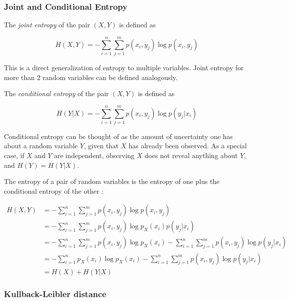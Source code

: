 \documentclass[12pt]{article}
\begin{document}
\subsubsection{Joint and Conditional Entropy}

The \textit{joint entropy} \cite{cover-thomas} of the pair $(X,Y)$ is defined as 

\begin{equation}
H(X,Y) = -\sum_{i=1}^n \sum_{j=1}^m p(x_i,y_j) \log p(x_i,y_j)
\label{eq:cond-etropy}
\end{equation}

This is a direct generalization of entropy to multiple variables. Joint entropy for more than 2 random variables can be defined analogously.

The \textit{conditional entropy} \cite{cover-thomas} of the pair $(X,Y)$ is defined as 

\begin{equation}
H(Y|X) = - \sum_{i=1}^n \sum_{j=1}^m p(x_i,y_j) \log p(y_j|x_i)
\end{equation}

Conditional entropy can be thought of as the amount of uncertainty one has about a random variable $Y$, given that $X$ has already been observed. As a special case, if $X$ and $Y$ are independent, observing $X$ does not reveal anything about $Y$, and $H(Y) = H(Y|X)$.

The entropy of a pair of random variables is the entropy of one plus the conditional entropy of the other \cite{cover-thomas}: 

\begin{equation}
\begin{split}
H(X,Y) & = -\sum_{i=1}^n \sum_{j=1}^m p(x_i,y_j) \log p(x_i,y_j) \\
 	   & = -\sum_{i=1}^n \sum_{j=1}^m p(x_i,y_j) \log p_X(x_i)p(y_j|x_i) \\ 
 	   & = -\sum_{i=1}^n \sum_{j=1}^m p(x_i,y_j) \log p_X(x_i) - \sum_{i=1}^n \sum_{j=1}^m p(x_i,y_j) \log p(y_j|x_i) \\
 	   & = -\sum_{i=1}^n p_X(x_i) \log p_X(x_i) - \sum_{i=1}^n \sum_{j=1}^m p(x_i,y_j) \log p(y_j|x_i) \\ 
 	   & = H(X) + H(Y|X)
\label{eq:chain-rule-entropy}
\end{split}
\end{equation}


\subsubsection{Kullback-Leibler distance}
\end{document}
